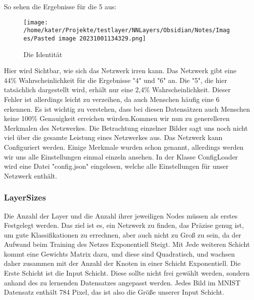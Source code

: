 \documentclass[12pt]{article}
\begin{document}
So sehen die Ergebnisse für die 5 aus:\begin{figure}[H]
\centering
\texttt{[image: /home/kater/Projekte/testlayer/NNLayers/Obsidian/Notes/Images/Pasted image 20231001134329.png]}
\caption{Die Identität}
\label{Was kommt hier rein?}\end{figure}Hier wird Sichtbar, wie sich das Netzwerk irren kann. Das Netzwerk gibt eine 44\% Wahrscheinlichkeit für die Ergebnisse "4" und "6" an. Die "5", die hier tatsächlich dargestellt wird, erhält nur eine 2,4\% Wahrscheinlichkeit. Dieser Fehler ist allerdings leicht zu verzeihen, da auch Menschen häufig eine 6 erkennen. Es ist wichtig zu verstehen, dass bei diesen Datensätzen auch Menschen keine 100\% Genauigkeit erreichen würden.Kommen wir nun zu generelleren Merkmalen des Netzwerkes. Die Betrachtung einzelner Bilder sagt uns noch nicht viel über die gesamte Leistung eines Netzwerkes aus. Das Netzwerk kann Configuriert werden. Einige Merkmale wurden schon genannt, allerdings werden wir uns alle Einstellungen einmal einzeln ansehen. In der Klasse ConfigLoader wird eine Datei "config.json" eingelesen, welche alle Einstellungen für unser Netzwerk enthält.\subsubsection{ LayerSizes}Die Anzahl der Layer und die Anzahl ihrer jeweiligen Nodes müssen als erstes Festgelegt werden. Das ziel ist es, ein Netzwerk zu finden, das Präzise genug ist, um gute Klassifikationen zu errechnen, aber auch nicht zu Groß zu sein, da der Aufwand beim Training des Netzes Exponentiell Steigt. Mit Jede weiteren Schicht kommt eine Gewichts Matrix dazu, und diese sind Quadratisch, und wachsen daher zusammen mit der Anzahl der Knoten in einer Schicht Exponentiell. 
Die Erste Schicht ist die Input Schicht. Diese sollte nicht frei gewählt werden, sondern anhand des zu lernenden Datensatzes angepasst werden. Jedes Bild im MNIST Datensatz enthält 784 Pixel, das ist also die Größe unserer Input Schicht.
\end{document}

